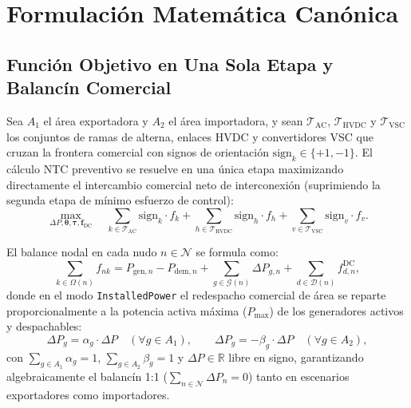 \documentclass[11pt,a4paper]{article}
\begin{document}
\section{Formulación Matemática Canónica}

\subsection{Función Objetivo en Una Sola Etapa y Balancín Comercial}
Sea $A_1$ el área exportadora y $A_2$ el área importadora, y sean $\mathcal{T}_{\text{AC}}$, $\mathcal{T}_{\text{HVDC}}$ y $\mathcal{T}_{\text{VSC}}$ los conjuntos de ramas de alterna, enlaces HVDC y convertidores VSC que cruzan la frontera comercial con signos de orientación $\text{sign}_k \in \{+1, -1\}$. El cálculo NTC preventivo se resuelve en una única etapa maximizando directamente el intercambio comercial neto de interconexión (suprimiendo la segunda etapa de mínimo esfuerzo de control):
\begin{equation}
\max_{\Delta P, \bm{\theta}, \bm{\tau}, \bm{f}_{\text{DC}}} \quad \sum_{k \in \mathcal{T}_{\text{AC}}} \text{sign}_k \cdot f_k + \sum_{h \in \mathcal{T}_{\text{HVDC}}} \text{sign}_h \cdot f_h + \sum_{v \in \mathcal{T}_{\text{VSC}}} \text{sign}_v \cdot f_v.
\end{equation}

El balance nodal en cada nudo $n \in \mathcal{N}$ se formula como:
\begin{equation}
\sum_{k \in \Omega(n)} f_{nk} = P_{\text{gen}, n} - P_{\text{dem}, n} + \sum_{g \in \mathcal{G}(n)} \Delta P_{g, n} + \sum_{d \in \mathcal{D}(n)} f_{d, n}^{\text{DC}},
\end{equation}
donde en el modo \texttt{InstalledPower} el redespacho comercial de área se reparte proporcionalmente a la potencia activa máxima ($P_{\max}$) de los generadores activos y despachables:
\begin{equation}
\Delta P_{g} = \alpha_g \cdot \Delta P \quad (\forall g \in A_1), \qquad \Delta P_{g} = -\beta_g \cdot \Delta P \quad (\forall g \in A_2),
\end{equation}
con $\sum_{g \in A_1} \alpha_g = 1$, $\sum_{g \in A_2} \beta_g = 1$ y $\Delta P \in \mathbb{R}$ libre en signo, garantizando algebraicamente el balancín 1:1 ($\sum_{n \in \mathcal{N}} \Delta P_n = 0$) tanto en escenarios exportadores como importadores.
\end{document}
